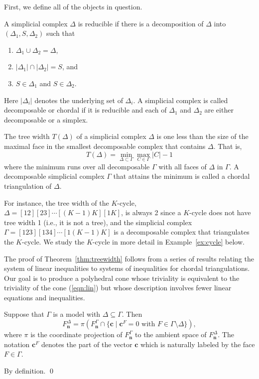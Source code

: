 \documentclass{elsart}
\newcommand{\nn}{\mathbf{n}}
\begin{document}
First, we  define all of the objects in question.

\begin{defn}
 A simplicial complex $\Delta$ is reducible if there is a
 decomposition of $\Delta$ into $(\Delta_1, S, \Delta_2)$ such that
\begin{enumerate}
\item  $\Delta_1 \cup \Delta_2  = \Delta$,
\item  $|\Delta_1| \cap |\Delta_2| = S$, and
\item  $S \in \Delta_1$ and $S \in \Delta_2$.
\end{enumerate}
Here $|\Delta_i|$ denotes the underlying set of $\Delta_i$.  A
simplicial complex is called decomposable or chordal if it is 
reducible and each of $\Delta_1$ and $\Delta_2$ are either
decomposable or a simplex.
\end{defn}

\begin{defn}
The tree width $T(\Delta)$ of a simplicial complex $\Delta$ is one
less than the size of the maximal face in the smallest decomposable
complex that contains $\Delta$.  That is,
\[
T(\Delta) = \min_{\Delta \subset \Gamma}  \max_{C \in \Gamma}  |C| - 1
\]
where the minimum runs over all decomposable  $\Gamma$ with
all faces of $\Delta$ in $\Gamma$.  A decomposable simplicial complex
$\Gamma$ that attains the minimum is called a chordal triangulation of
$\Delta$.
\end{defn}

For instance, the tree width of the $K$-cycle,
$\Delta = [12][23]\cdots[(K-1)K][1K]$, is always 2 since
a $K$-cycle does not have tree width 1 (i.e., it is not a tree), and the
simplicial complex $\Gamma = [123][134]\cdots[1(K-1)K]$ is a
decomposable complex that triangulates the $K$-cycle.  We study
the $K$-cycle in more detail in Example~\ref{ex:cycle} below.

The proof of Theorem~\ref{thm:treewidth} follows from a series of
results relating the system of linear inequalities to systems of
inequalities for chordal triangulations.  Our goal is to produce a
polyhedral cone whose triviality is equivalent to the triviality of
the cone (\ref{eqn:lin}) but whose description involves fewer linear
equations and inequalities. 

\begin{lem}\label{lem:cap}
Suppose that $\Gamma$ is a model with $\Delta \subseteq \Gamma$. Then
\[
F^\Delta_\nn = 
\pi(F^{\Gamma}_\nn  \cap \{ \mathbf{c} \mid \mathbf{c}^F = 
0 \text{ with } F \in \Gamma \setminus \Delta \}),
\]
where $\pi$ is the coordinate projection of $F^{\Gamma}_{\mathbf{n}}$
to the ambient space of $F^\Delta_\nn$.  The notation $\mathbf{c}^F$
denotes the part of the vector $\mathbf{c}$ which is naturally
labeled by the face $F \in \Gamma$.
\end{lem}
\begin{pf}
By definition. \qed
\end{pf}
\end{document}
